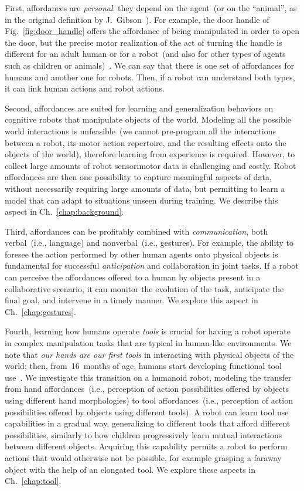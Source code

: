 First, affordances are \emph{personal}: they depend on the agent~(or on the ``animal'', as in the original definition by J.~Gibson~\cite{jgibson:2014}).
For example, the door handle of Fig.~\ref{fig:door_handle} offers the affordance of being manipulated in order to open the door, but the precise motor realization of the act of turning the handle is different for an adult human or for a robot~(and also for other types of agents such as children or animals)~\cite{chemero:2003:outline,chemero:2007:gibsonian,jamone:2016:tcds}.
We can say that there is one set of affordances for humans and another one for robots.
Then, if a robot can understand both types, it can link human actions and robot actions.

Second, affordances are suited for learning and generalization behaviors on cognitive robots that manipulate objects of the world.
Modeling all the possible world interactions is unfeasible~(we cannot pre-program all the interactions between a robot, its motor action repertoire, and the resulting effects onto the objects of the world), therefore learning from experience is required.
However, to collect large amounts of robot sensorimotor data is challenging and costly.
Robot affordances are then one possibility to capture meaningful aspects of data, without necessarily requiring large amounts of data, but permitting to learn a model that can adapt to situations unseen during training.
We describe this aspect in Ch.~\ref{chap:background}.

Third, affordances can be profitably combined with \emph{communication}, both verbal~(i.e., language) and nonverbal~(i.e., gestures).
For example, the ability to foresee the action performed by other human agents onto physical objects is fundamental for successful \emph{anticipation} and collaboration in joint tasks.
If a robot can perceive the affordances offered to a human by objects present in a collaborative \hr{} scenario, it can monitor the evolution of the task, anticipate the final goal, and intervene in a timely manner.
We explore this aspect in Ch.~\ref{chap:gestures}.

Fourth, learning how humans operate \emph{tools} is crucial for having a robot operate in complex manipulation tasks that are typical in human-like environments.
We note that \emph{our hands are our first tools} in interacting with physical objects of the world; then, from~16~months of age, humans start developing functional tool use~\cite{fagard:2014:emergence}.
We investigate this transition on a humanoid robot, modeling the transfer from hand affordances~(i.e., perception of action possibilities offered by objects using different hand morphologies) to tool affordances~(i.e., perception of action possibilities offered by objects using different tools).
A robot can learn tool use capabilities in a gradual way, generalizing to different tools that afford different possibilities, similarly to how children progressively learn mutual interactions between different objects. Acquiring this capability permits a robot to perform actions that would otherwise not be possible, for example grasping a faraway object with the help of an elongated tool.
We explore these aspects in Ch.~\ref{chap:tool}.


